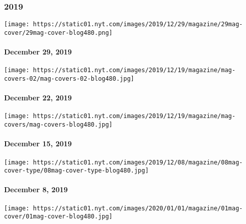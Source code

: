 \hypertarget{2019}{%
\subsubsection{2019}\label{2019}}

\href{https://www.nytimes.com/issue/magazine/2019/12/24/the-122919-issue}{}

\texttt{[image: https://static01.nyt.com/images/2019/12/29/magazine/29mag-cover/29mag-cover-blog480.png]}

\hypertarget{december-29-2019}{%
\paragraph{December 29, 2019}\label{december-29-2019}}

\href{https://www.nytimes.com/issue/magazine/2019/12/19/the-122219-issue}{}

\texttt{[image: https://static01.nyt.com/images/2019/12/19/magazine/mag-covers-02/mag-covers-02-blog480.jpg]}

\hypertarget{december-22-2019}{%
\paragraph{December 22, 2019}\label{december-22-2019}}

\href{https://www.nytimes.com/issue/magazine/2019/12/19/the-121519-issue}{}

\texttt{[image: https://static01.nyt.com/images/2019/12/19/magazine/mag-covers/mag-covers-blog480.jpg]}

\hypertarget{december-15-2019}{%
\paragraph{December 15, 2019}\label{december-15-2019}}

\href{https://www.nytimes.com/issue/magazine/2019/12/06/the-12819-issue}{}

\texttt{[image: https://static01.nyt.com/images/2019/12/08/magazine/08mag-cover-type/08mag-cover-type-blog480.jpg]}

\hypertarget{december-8-2019}{%
\paragraph{December 8, 2019}\label{december-8-2019}}

\href{https://www.nytimes.com/issue/magazine/2019/12/03/the-12119-issue}{}

\texttt{[image: https://static01.nyt.com/images/2020/01/01/magazine/01mag-cover/01mag-cover-blog480.jpg]}

